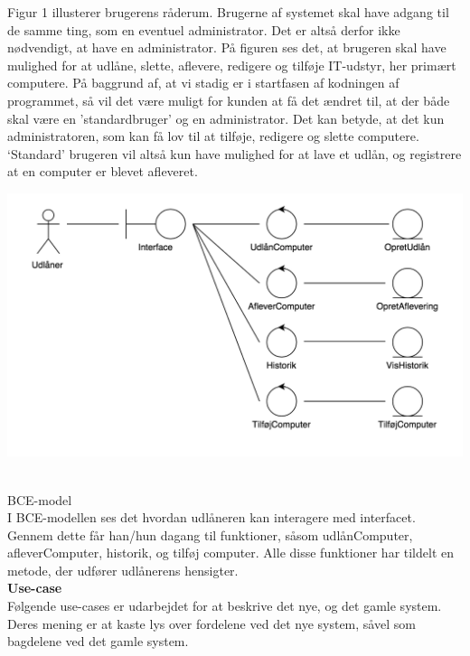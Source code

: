\documentclass[a4paper]{article}
\begin{document}
Figur 1 illusterer brugerens råderum. Brugerne af systemet skal have adgang til de samme ting, som en eventuel administrator. Det er altså derfor ikke nødvendigt, at have en administrator. På figuren ses det, at brugeren skal have mulighed for at udlåne, slette, aflevere, redigere og tilføje IT-udstyr, her primært computere. På baggrund af, at vi stadig er i startfasen af kodningen af programmet, så vil det være muligt for kunden at få det ændret til, at der både skal være en 'standardbruger' og en administrator. Det kan betyde, at det kun administratoren, som kan få lov til at tilføje, redigere og slette  computere. ‘Standard' brugeren vil altså kun have mulighed for at lave et udlån, og registrere at en computer er blevet afleveret.\\
\centerline{\includegraphics[scale=0.5]{BCE.png}}\\
BCE-model\\
I BCE-modellen ses det hvordan udlåneren kan interagere med interfacet. Gennem dette får han/hun dagang til funktioner, såsom udlånComputer, afleverComputer, historik, og tilføj computer. Alle disse funktioner har tildelt en metode, der udfører udlånerens hensigter.\\
\textbf{Use-case}\\
Følgende use-cases er udarbejdet for at beskrive det nye, og det gamle system. Deres mening er at kaste lys over fordelene ved det nye system, såvel som bagdelene ved det gamle system. \\
\end{document}
